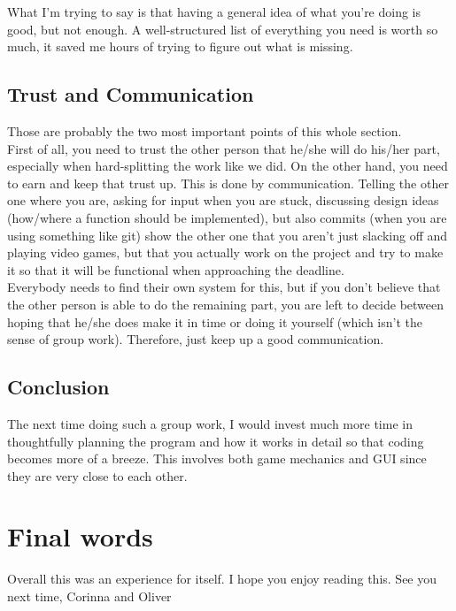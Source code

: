 \documentclass[12pt]{scrartcl}
\begin{document}
	What I'm trying to say is that having a general idea of what you're doing is good, but not enough. A well-structured list of everything you need is worth so much, it saved me hours of trying to figure out what is missing.

	\subsection{Trust and Communication}
	Those are probably the two most important points of this whole section.\\

	First of all, you need to trust the other person that he/she will do his/her part, especially when hard-splitting the work like we did. On the other hand, you need to earn and keep that trust up. This is done by communication. Telling the other one where you are, asking for input when you are stuck, discussing design ideas (how/where a function should be implemented), but also commits (when you are using something like git) show the other one that you aren't just slacking off and playing video games, but that you actually work on the project and try to make it so that it will be functional when approaching the deadline.\\

	Everybody needs to find their own system for this, but if you don't believe that the other person is able to do the remaining part, you are left to decide between hoping that he/she does make it in time or doing it yourself (which isn't the sense of group work). Therefore, just keep up a good communication.

	\subsection{Conclusion}
	The next time doing such a group work, I would invest much more time in thoughtfully planning the program and how it works in detail so that coding becomes more of a breeze. This involves both game mechanics and GUI since they are very close to each other.

	\clearpage


	\section{Final words}\label{sec:final_words}
	Overall this was an experience for itself. I hope you enjoy reading this. See you next time,
	Corinna and Oliver
\end{document}
